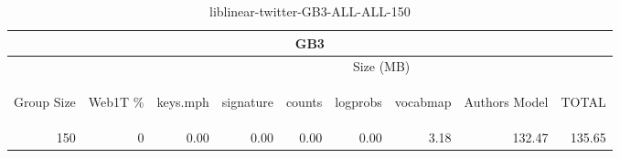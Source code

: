 \begin{center}
\begin{table}[htbp]
\begin{tabular}{ | r | r | r | r | r | r | r | r | r |}
\hline
\multicolumn{9}{|c|}{GB3}\\
\hline
 & & \multicolumn{7}{|c|}{Size (MB)}\\ \cline{3-9}
\begin{sideways}Group Size\end{sideways} & \begin{sideways}Web1T \% \end{sideways} & \begin{sideways}keys.mph\end{sideways} & \begin{sideways}signature\end{sideways} & \begin{sideways}counts\end{sideways} & \begin{sideways}logprobs\end{sideways} & \begin{sideways}vocabmap\end{sideways} & \begin{sideways}Authors Model \end{sideways} & \begin{sideways}TOTAL\end{sideways}\\
\hline
\multirow{0}{*}{150}
 & 0 & 0.00 & 0.00 & 0.00 & 0.00 & 3.18 & 132.47 & 135.65\\ \cline{2-9}
\hline
\end{tabular}
\caption{liblinear-twitter-GB3-ALL-ALL-150}
\label{table:liblinear-twitter-GB3-ALL-ALL-150}
\end{table}
\end{center}

